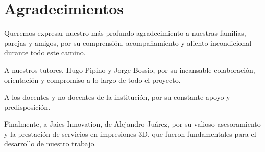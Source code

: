 \section*{Agradecimientos}
\justifying

Queremos expresar nuestro más profundo agradecimiento a nuestras familias, parejas y amigos, por su comprensión, acompañamiento y aliento incondicional durante todo este camino.

A nuestros tutores, Hugo Pipino y Jorge Bossio, por su incansable colaboración, orientación y compromiso a lo largo de todo el proyecto.

A los docentes y no docentes de la institución, por su constante apoyo y predisposición.

Finalmente, a Jaies Innovation, de Alejandro Juárez, por su valioso asesoramiento y la prestación de servicios en impresiones 3D, que fueron fundamentales para el desarrollo de nuestro trabajo.